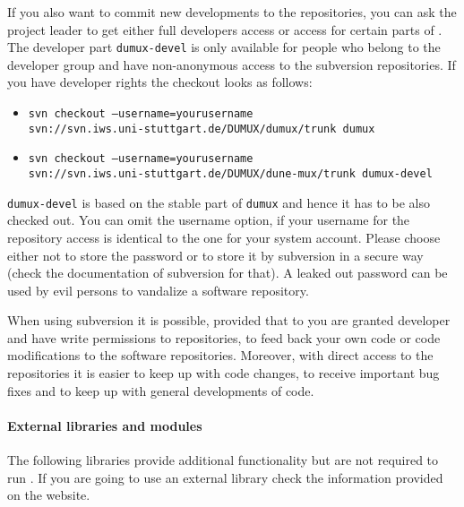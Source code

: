If you also want to commit new developments to the repositories, you can ask the \Dumux project leader to get either full developers access or access for certain parts of \Dumux. The developer part \texttt{dumux-devel} is only available for people who belong to the \Dumux developer group and have non-anonymous access to the subversion repositories. If you have developer rights the checkout looks as follows: 
\begin{itemize}
 \item \texttt{svn checkout --username=yourusername \\ 
      \hspace{4cm} svn://svn.iws.uni-stuttgart.de/DUMUX/dumux/trunk dumux}
 \item \texttt{svn checkout --username=yourusername \\
      \hspace{4cm} svn://svn.iws.uni-stuttgart.de/DUMUX/dune-mux/trunk dumux-devel}
\end{itemize} 
\texttt{dumux-devel} is based on the stable part of \texttt{dumux} and hence it has to be also checked out. You can omit the username option, if your username for the repository access is identical to the one for your system account. Please choose either not to store the password or to store it by subversion in a secure way (check the documentation of subversion for that). A leaked out password can be used by evil persons to vandalize a software repository.

When using subversion it is possible, provided that to you are granted developer and have write permissions to repositories, to feed back your own code or code modifications to the software repositories. Moreover, with direct access to the repositories it is easier to keep up with code changes, to receive important bug fixes and to keep up with general developments of code.

\paragraph{External libraries and modules}

The following libraries provide additional functionality but are not required to run \Dumux. If you are going to use an external library check the information provided on the \Dune website.

